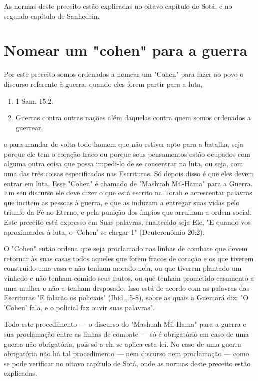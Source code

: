 \begin{itemize}
\begin{enumrate}
\begin{itemize}
\begin{itemize}
\begin{itemize}
As normas deste preceito estão explicadas no oitavo capítulo de So­tá, e
no segundo capítulo de Sanhedrin.

\section{Nomear um "cohen" para a guerra}

Por este preceito somos ordenados a nomear um "Cohen" para fa­zer ao
povo o discurso referente à guerra, quando eles forem partir para a
luta,


\begin{enumerate}
\def\labelenumi{\arabic{enumi}.}
\setcounter{enumi}{194}
\item
 
 1 Sam. 15:2.
 
\item
 
 Guerras contra outras nações além daquelas contra quem somos ordenados
 a guerrear.
 
\end{enumerate}

e para mandar de volta todo homem que não estiver apto para a batalha,
seja porque ele tem o coração fraco ou porque seus pensamentos estão
ocupados com alguma outra coisa que possa impedi-lo de se concentrar na
luta, ou seja, com uma das três coisas especificadas nas Escrituras. Só
depois disso é que eles devem entrar em luta. Esse "Cohen" é chamado de
"Mashuah Mil-Hama" para a Guerra. Em seu discurso ele deve dizer o que
está escrito na Torah e acres­centar palavras que incitem as pessoas à
guerra, e que as induzam a entregar suas vidas pelo triunfo da Fé no
Eterno, e pela punição dos ímpios que arrui­nam a ordem social. Este
preceito está expresso em Suas palavras, enaltecido seja Ele, "E quando
vos aproximardes à luta, o 'Cohen' se chegar-1" (Deutero­nômio 20:2).

O "Cohen" então ordena que seja proclamado nas linhas de comba­te que
devem retornar às suas casas todos aqueles que forem fracos de coração e
os que tiverem construído uma casa e não tenham morado nela, ou que
tive­rem plantado um vinhedo e não tenham comido seus frutos, ou que
tenham prometido casamento a uma mulher e não a tenham desposado. Isso
está de acordo com as palavras das Escrituras "E falarão os policiais"
(Ibid., 5-8), sobre as quais a Guemará diz: "O 'Cohen' fala, e o
policial faz ouvir suas palavras".

Todo este procedimento --- o discurso do "Mashuah Mil-Hama" pa­ra a
guerra e sua proclamação entre as linhas de combate --- só é obrigatório
em caso de uma guerra não obrigatória, pois só a ela se aplica esta lei.
No caso de uma guerra obrigatória não há tal procedimento --- nem
discurso nem pro­clamação --- como se pode verificar no oitavo capítulo
de Sotá, onde as nor­mas deste preceito estão explicadas.


\end{itemize}
\end{itemize}
\end{itemize}
\end{enumrate}
\end{itemize}
